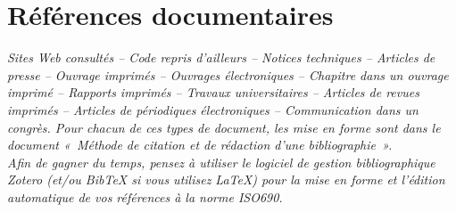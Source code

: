 \chapter*{Références documentaires}

\noindent\textit{Sites Web consultés – Code repris d’ailleurs – Notices techniques – Articles de presse – Ouvrage imprimés – Ouvrages électroniques – Chapitre dans un ouvrage imprimé – Rapports imprimés – Travaux universitaires – Articles de revues imprimés – Articles de périodiques électroniques – Communication dans un congrès. Pour chacun de ces types de document, les mise en forme sont dans le document « Méthode de citation et de rédaction d’une bibliographie ».}\\

\textit{Afin de gagner du temps, pensez à utiliser le logiciel de gestion bibliographique Zotero (et/ou BibTeX si vous utilisez LaTeX) pour la mise en forme et l’édition automatique de vos références à la norme ISO690.}